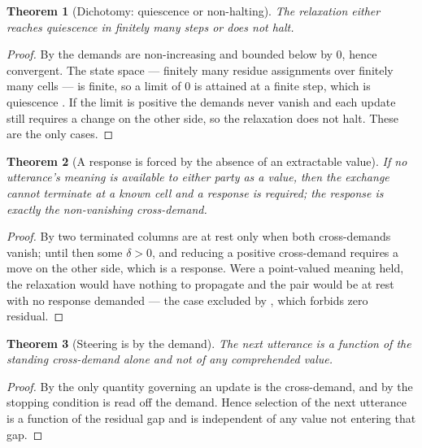\documentclass[11pt,a4paper]{article}
\theoremstyle{clstyle}
\newtheorem{theorem}{Theorem}[section]
\theoremstyle{definition}
\theoremstyle{remark}
\newcommand{\dem}{\delta}
\begin{document}
\begin{theorem}[Dichotomy: quiescence or non-halting]
\label{thm:relax-dichotomy}
The relaxation either reaches quiescence in finitely many steps or does not
halt.
\end{theorem}

\begin{proof}
By  the demands are non-increasing and bounded below by
$0$, hence convergent. The state space --- finitely many residue assignments
over finitely many cells --- is finite, so a limit of $0$ is attained at a
finite step, which is quiescence \citep{banach1922operations,
tarski1955lattice}. If the limit is positive the demands never vanish and
each update still requires a change on the other side, so the relaxation does
not halt. These are the only cases.
\end{proof}

\begin{theorem}[A response is forced by the absence of an extractable value]
\label{thm:response}
If no utterance's meaning is available to either party as a value, then the
exchange cannot terminate at a known cell and a response is required; the
response is exactly the non-vanishing cross-demand.
\end{theorem}

\begin{proof}
By  two terminated columns are at rest only when both
cross-demands vanish; until then some $\dem>0$, and reducing a positive
cross-demand requires a move on the other side, which is a response. Were a
point-valued meaning held, the relaxation would have nothing to propagate and
the pair would be at rest with no response demanded --- the case excluded by
, which forbids zero residual.
\end{proof}

\begin{theorem}[Steering is by the demand]
\label{thm:steer}
The next utterance is a function of the standing cross-demand alone and not
of any comprehended value.
\end{theorem}

\begin{proof}
By  the only quantity governing an update is the
cross-demand, and by  the stopping condition is
read off the demand. Hence selection of the next utterance is a function of
the residual gap and is independent of any value not entering that gap.
\end{proof}
\end{document}
